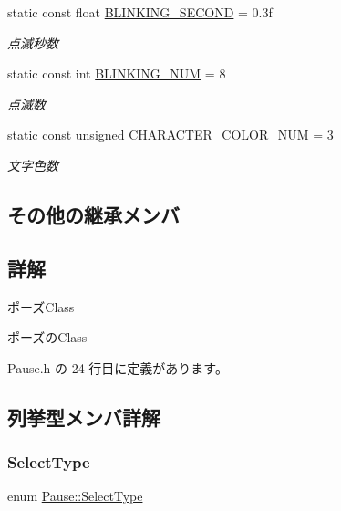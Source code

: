 \begin{DoxyCompactItemize}
static const float \mbox{\hyperlink{class_pause_a17f47107051e4a01a5fef550bbe9edd1}{B\+L\+I\+N\+K\+I\+N\+G\+\_\+\+S\+E\+C\+O\+ND}} = 0.\+3f
\begin{DoxyCompactList}\small\item\em 点滅秒数 \end{DoxyCompactList}\item 
static const int \mbox{\hyperlink{class_pause_a9c2be6415b80f755aea9b77572c31c69}{B\+L\+I\+N\+K\+I\+N\+G\+\_\+\+N\+UM}} = 8
\begin{DoxyCompactList}\small\item\em 点滅数 \end{DoxyCompactList}\item 
static const unsigned \mbox{\hyperlink{class_pause_a1f0cde57b638afcbe97baa0c0cbd6229}{C\+H\+A\+R\+A\+C\+T\+E\+R\+\_\+\+C\+O\+L\+O\+R\+\_\+\+N\+UM}} = 3
\begin{DoxyCompactList}\small\item\em 文字色数 \end{DoxyCompactList}\end{DoxyCompactItemize}
\subsection*{その他の継承メンバ}


\subsection{詳解}
ポーズ\+Class 

ポーズの\+Class 

 Pause.\+h の 24 行目に定義があります。



\subsection{列挙型メンバ詳解}
\mbox{\label{class_pause_a13a552c560a41cf0b17cbef35f8fece7}} 
\subsubsection{\texorpdfstring{Select\+Type}{SelectType}}
{\footnotesize\ttfamily enum \mbox{\hyperlink{class_pause_a13a552c560a41cf0b17cbef35f8fece7}{Pause\+::\+Select\+Type}}\hspace{0.3cm}{\ttfamily [strong]}}

